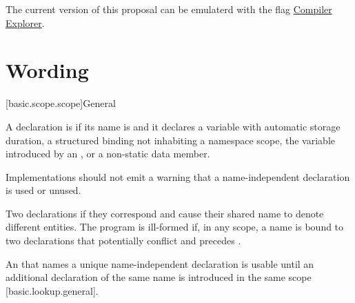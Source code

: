 \documentclass{wg21}
\begin{document}
{The current version of this proposal can be emulaterd with the  flag \href{https://godbolt.org/z/_C6X7L}{Compiler Explorer}.


\section{Wording}

[basic.scope.scope]{General}

\begin{addedblock}


A declaration is  if its name is \tcode{_}
and it declares a variable with automatic storage duration, a structured binding not inhabiting a namespace scope, the variable introduced by an , or a non-static data member.




\recommended
Implementations should not emit a warning that  a name-independent declaration is used or unused.

\end{addedblock}

Two declarations 
if they correspond and
cause their shared name to denote different entities.
The program is ill-formed
if, in any scope, a name is bound to two declarations 
that potentially conflict and  precedes  .

\begin{addedblock}
\begin{note}
An  that names a unique name-independent declaration is usable until
an additional declaration of the same name is introduced in the same scope [basic.lookup.general].
\end{note}
\end{addedblock}


}
\end{document}
